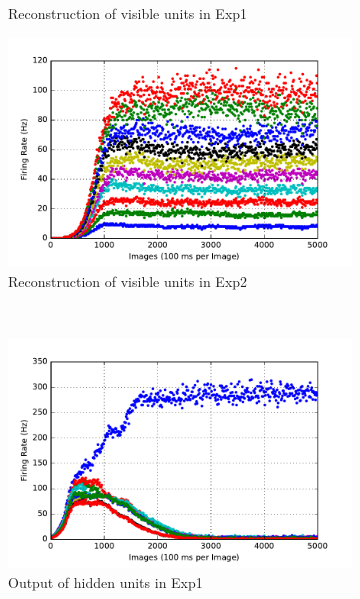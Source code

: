 \begin{figure}
\begin{subfigure}[t]{0.45\textwidth}
		\caption{Reconstruction of visible units in Exp1}
	\end{subfigure}
	\begin{subfigure}[t]{0.45\textwidth}
		\includegraphics[width=\textwidth]{pics_sdlm/10_exp_SRBM_Orig/exp2_recon_s.pdf}
		\caption{Reconstruction of visible units in Exp2}
	\end{subfigure}\\
	\begin{subfigure}[t]{0.45\textwidth}
		\includegraphics[width=\textwidth]{pics_sdlm/10_exp_SRBM_Orig/exp1_hid_s.pdf}
		\caption{Output of hidden units in Exp1}
	\end{subfigure}
	\begin{subfigure}[t]{0.45\textwidth}

\end{subfigure}
\end{figure}

